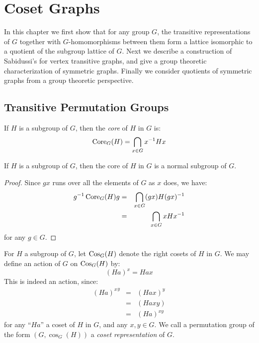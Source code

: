 \chapter{Coset Graphs}

In this chapter we first show that for any group $G$, 
the transitive representations of $G$
together with $G$-homomorphisms between them
form a lattice isomorphic to a quotient of
the subgroup lattice of $G$.
Next we describe a construction of Sabidussi's
for vertex transitive graphs, and give a 
group theoretic characterization
of symmetric graphs.
Finally we consider quotients 
of symmetric graphs from a group theoretic perspective. 


\section{Transitive Permutation Groups}

\begin{definition}
If $H$ is a subgroup of $G$, then the \emph{core} of $H$ in $G$ is:
$$\operatorname{Core}_G(H) = \bigcap_{x \in G} x^{-1} H x $$
\end{definition}

\begin{proposition} If $H$ is a subgroup of $G$, 
then the core of $H$ in $G$ is a normal subgroup of $G$.
\begin{proof}
Since $gx$ runs over all the elements of $G$ as $x$ does, we have:
\begin{eqnarray*}
g^{-1}\operatorname{Core}_G(H)g & = & \bigcap_{x \in G} (gx) H (gx)^{-1} \\
                  & = & \bigcap_{x \in G} x H x^{-1} 
\end{eqnarray*}               
for any $g \in G$. 
\end{proof}
\end{proposition}

\begin{definition} 
For $H$ a subgroup of $G$,
let $\operatorname{Cos}_G(H)$ denote the right cosets of $H$ in $G$.
We may define an action of $G$ on $\operatorname{Cos}_G(H)$ by:
$$ (Ha)^x = Hax $$
This is indeed an action, since:
\begin{eqnarray*}
{(Ha)^x}^y & = & (Hax)^y \\
           & = & (Haxy) \\
	   & = & (Ha)^{xy}
\end{eqnarray*}
for any ``$Ha$'' a coset of $H$ in $G$, and any $x,y \in G$.
We call a permutation group of the form $(G,\cos_G(H))$ a
{\it coset representation} of $G$.
\end{definition}

